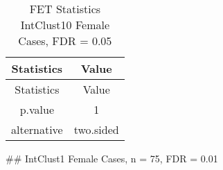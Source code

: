 \documentclass[]{article}
\begin{document}
\begin{longtable}[]{@{}cc@{}}
\caption{FET Statistics IntClust10 Female Cases, FDR =
0.05}\tabularnewline
\toprule
\begin{minipage}[b]{0.18\columnwidth}\centering\strut
Statistics\strut
\end{minipage} & \begin{minipage}[b]{0.14\columnwidth}\centering\strut
Value\strut
\end{minipage}\tabularnewline
\midrule
\endfirsthead
\toprule
\begin{minipage}[b]{0.18\columnwidth}\centering\strut
Statistics\strut
\end{minipage} & \begin{minipage}[b]{0.14\columnwidth}\centering\strut
Value\strut
\end{minipage}\tabularnewline
\midrule
\endhead
\begin{minipage}[t]{0.18\columnwidth}\centering\strut
p.value\strut
\end{minipage} & \begin{minipage}[t]{0.14\columnwidth}\centering\strut
1\strut
\end{minipage}\tabularnewline
\begin{minipage}[t]{0.18\columnwidth}\centering\strut
alternative\strut
\end{minipage} & \begin{minipage}[t]{0.14\columnwidth}\centering\strut
two.sided\strut
\end{minipage}\tabularnewline
\bottomrule
\end{longtable}

\pagebreak
\#\# IntClust1 Female Cases, n = 75, FDR = 0.01
\end{document}

